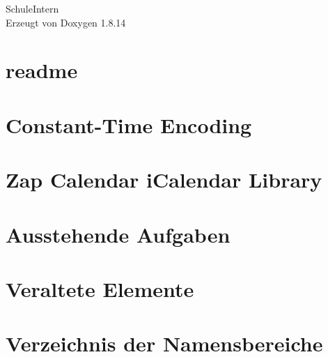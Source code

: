 \documentclass[twoside]{book}
\newcommand{\+}{\discretionary{\mbox{\scriptsize$\hookleftarrow$}}{}{}}
\newcommand{\clearemptydoublepage}{%
  \newpage{\pagestyle{empty}\cleardoublepage}%
}
\begin{document}
\hypersetup{pageanchor=false,
             bookmarksnumbered=true,
             pdfencoding=unicode
            }
\begin{titlepage}
\vspace*{7cm}
\begin{center}%
{\Large Schule\+Intern }\\
\vspace*{1cm}
{\large Erzeugt von Doxygen 1.8.14}\\
\end{center}
\end{titlepage}
\clearemptydoublepage
{}
\tableofcontents
\clearemptydoublepage
{}
\hypersetup{pageanchor=true}

\chapter{readme}
\label{md__upload_framework_lib_composer_readme}

\chapter{Constant-\/\+Time Encoding}
\label{md__upload_framework_lib_composer_vendor_paragonie_constant_time_encoding__r_e_a_d_m_e}

\chapter{Zap Calendar i\+Calendar Library}
\label{md__upload_framework_lib_ical__r_e_a_d_m_e}

\chapter{Ausstehende Aufgaben}
\label{todo}

\chapter{Veraltete Elemente}
\label{deprecated}

\chapter{Verzeichnis der Namensbereiche}

\end{document}
